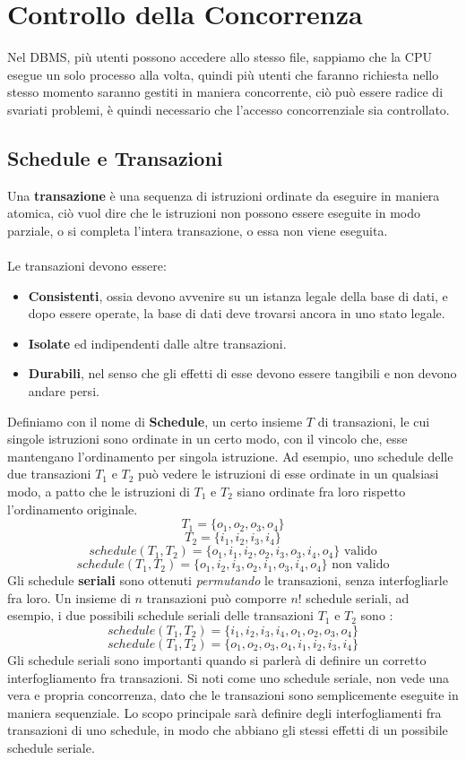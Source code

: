 \documentclass[12pt, letterpaper]{article}
\newcommand{\acc}{\\\hphantom{}\\}
\begin{document}
\section{Controllo della Concorrenza}
Nel DBMS, più utenti possono accedere allo stesso file, sappiamo che la CPU esegue un solo processo alla volta, quindi 
più utenti che faranno richiesta nello stesso momento saranno gestiti in maniera concorrente, ciò può essere radice di 
svariati problemi, è quindi necessario che l'accesso concorrenziale sia controllato.\subsection{Schedule e Transazioni}
Una \textbf{transazione} è una sequenza di istruzioni ordinate da eseguire in maniera atomica, ciò vuol 
dire che le istruzioni non possono essere eseguite in modo parziale, o si completa l'intera transazione, o essa non viene 
eseguita.\acc 
Le transazioni devono essere:\begin{itemize} \item \textbf{Consistenti}, ossia devono avvenire su un istanza legale della base di dati, e dopo essere 
operate, la base di dati deve trovarsi ancora in uno stato legale.\item  \textbf{Isolate} ed 
indipendenti dalle altre transazioni. \item \textbf{Durabili}, nel senso che gli effetti di esse  devono essere 
tangibili e non devono andare persi.\end{itemize} 
Definiamo con il nome di \textbf{Schedule}, un certo insieme \(T\) di transazioni, le cui singole istruzioni sono ordinate
in un certo modo, con il vincolo che, esse mantengano l'ordinamento per singola istruzione. Ad esempio, uno schedule 
delle due transazioni \(T_1\) e \(T_2\) può vedere le istruzioni di esse ordinate in un qualsiasi modo, a patto che 
le istruzioni di \(T_1\) e \(T_2\) siano ordinate fra loro rispetto l'ordinamento originale.$$T_1 = \{o_1,o_2,o_3,o_4\}$$
$$T_2=\{i_1,i_2,i_3,i_4\}$$$$schedule(T_1,T_2)=\{o_1,i_1,i_2,o_2,i_3,o_3,i_4,o_4\} \text{ valido}$$
$$schedule(T_1,T_2)=\{o_1,i_2,i_3,o_2,i_1,o_3,i_4,o_4\} \text{ non valido}$$
Gli schedule \textbf{seriali} sono ottenuti \textit{permutando} le transazioni, senza interfogliarle fra loro. Un insieme 
di \(n\) transazioni può comporre \(n!\) schedule seriali, ad esempio, i due possibili schedule seriali delle transazioni 
\(T_1\) e \(T_2\) sono : 
$$schedule(T_1,T_2)=\{i_1,i_2,i_3,i_4,o_1,o_2,o_3,o_4\}$$
$$schedule(T_1,T_2)=\{o_1,o_2,o_3,o_4,i_1,i_2,i_3,i_4\}$$
Gli schedule seriali sono importanti quando si parlerà di definire un corretto interfogliamento fra transazioni. Si noti come 
uno schedule seriale, non vede una vera e propria concorrenza, dato che le transazioni sono semplicemente eseguite in maniera sequenziale. 
Lo scopo principale sarà definire degli interfogliamenti fra transazioni di uno schedule, in modo che abbiano gli stessi 
effetti di un possibile schedule seriale.
\end{document}
